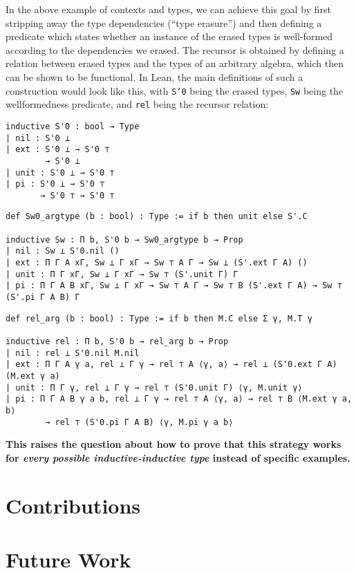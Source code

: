 \documentclass{easychair}
\begin{document}
In the above example of contexts and types, we can achieve this goal by
first stripping away the type dependencies (``type erasure'') and then defining
a predicate which states whether an instance of the erased types is well-formed
according to the dependencies we erased.
The recursor is obtained by defining a relation between erased types and the
types of an arbitrary algebra, which then can be shown to be functional.
In Lean, the main definitions of such a construction would look like this, with
\texttt{S'0} being the erased types, \texttt{Sw} being the wellformedness predicate,
and \texttt{rel} being the recursor relation:
\noindent
\begin{minipage}{.3\textwidth}
\begin{lstlisting}
inductive S'0 : bool → Type
| nil : S'0 ⊥
| ext : S'0 ⊥ → S'0 ⊤
        → S'0 ⊥
| unit : S'0 ⊥ → S'0 ⊤
| pi : S'0 ⊥ → S'0 ⊤
       → S'0 ⊤ → S'0 ⊤
\end{lstlisting}
\end{minipage} \hfill
\begin{minipage}{.68\textwidth}
\begin{lstlisting}
def Sw0_argtype (b : bool) : Type := if b then unit else S'.C

inductive Sw : Π b, S'0 b → Sw0_argtype b → Prop
| nil : Sw ⊥ S'0.nil ()
| ext : Π Γ A xΓ, Sw ⊥ Γ xΓ → Sw ⊤ A Γ → Sw ⊥ (S'.ext Γ A) ()
| unit : Π Γ xΓ, Sw ⊥ Γ xΓ → Sw ⊤ (S'.unit Γ) Γ
| pi : Π Γ A B xΓ, Sw ⊥ Γ xΓ → Sw ⊤ A Γ → Sw ⊤ B (S'.ext Γ A) → Sw ⊤ (S'.pi Γ A B) Γ
\end{lstlisting}
\end{minipage}
\noindent\begin{minipage}{\textwidth}\begin{lstlisting}
def rel_arg (b : bool) : Type := if b then M.C else Σ γ, M.T γ

inductive rel : Π b, S'0 b → rel_arg b → Prop
| nil : rel ⊥ S'0.nil M.nil
| ext : Π Γ A γ a, rel ⊥ Γ γ → rel ⊤ A ⟨γ, a⟩ → rel ⊥ (S'0.ext Γ A) (M.ext γ a)
| unit : Π Γ γ, rel ⊥ Γ γ → rel ⊤ (S'0.unit Γ) ⟨γ, M.unit γ⟩
| pi : Π Γ A B γ a b, rel ⊥ Γ γ → rel ⊤ A ⟨γ, a⟩ → rel ⊤ B ⟨M.ext γ a, b⟩
        → rel ⊤ (S'0.pi Γ A B) ⟨γ, M.pi γ a b⟩
\end{lstlisting}
\end{minipage}
\textbf{This raises the question about how to prove that this strategy works for \emph{every
possible inductive-inductive type} instead of specific examples.}


\section{Contributions}



\section{Future Work}



\end{document}
